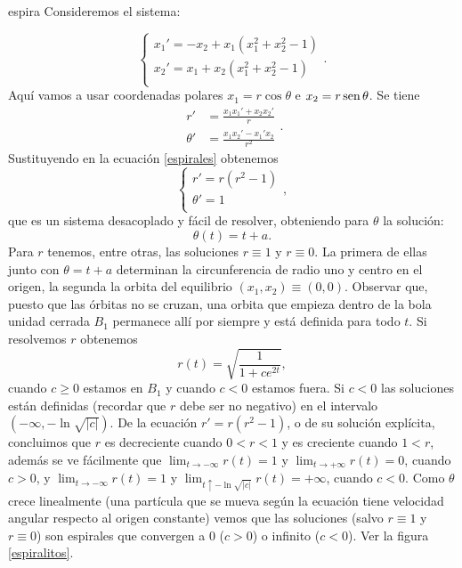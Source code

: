 \begin{ejemplo}{espira} Consideremos el sistema:

\begin{equation}\label{espirales}
\left\{%
\begin{array}{l}
    x_1'=-x_2+x_1(x_1^2+x_2^2-1) \\
    x_2'=x_1+ x_2(x_1^2+x_2^2-1)\\
\end{array} .%
\right.
\end{equation}
 Aquí vamos a
usar coordenadas polares $x_1=r\cos \theta$ e $x_2=r\sen \theta$.
Se tiene
\[
    \begin{split}
    r'&=\frac{x_1x_1'+x_2x_2'}{r}\\
    \theta'&=\frac{x_1x_2'-x_1'x_2}{r^2}
    \end{split}.
\]
Sustituyendo en la ecuación \eqref{espirales} obtenemos
\begin{equation}\label{espirales2}
\left\{%
\begin{array}{l}
    r'=r(r^2-1) \\
    \theta'=1\\
\end{array} ,%
\right.
\end{equation}
que es un sistema desacoplado y fácil de resolver, obteniendo para
$\theta$ la solución:
\[
    \theta(t)=t+a.
\]
Para $r$ tenemos, entre otras,  las soluciones $r\equiv 1$ y
$r\equiv 0$. La primera de ellas junto con $\theta=t+a$ determinan
la circunferencia de radio uno y centro en el origen, la segunda
la orbita del equilibrio $(x_1,x_2)\equiv(0,0)$. Observar que,
puesto que las órbitas no se cruzan, una orbita que empieza dentro
de la bola unidad cerrada $B_1$ permanece allí por siempre y está
definida para todo $t$. Si  resolvemos $r$ obtenemos
\[
r(t)=\sqrt{\frac{1}{1+ce^{2t}}},
\]
cuando $c\geq 0$ estamos en $B_1$ y cuando $c<0$ estamos fuera. Si
$c<0$ las soluciones están definidas (recordar que $r$ debe ser no
negativo) en el intervalo $(-\infty,-\ln\sqrt{|c|})$. De la
ecuación $r'=r(r^2-1)$, o de su solución explícita, concluimos que
$r$ es decreciente cuando $0<r<1$ y es creciente cuando $1<r$,
además se ve fácilmente que $\lim_{t\to -\infty}r(t)=1$ y
$\lim_{t\to +\infty}r(t)=0$, cuando $c>0$, y $\lim_{t\to
-\infty}r(t)=1$ y $\lim_{t\uparrow -\ln \sqrt{|c|}}r(t)=+\infty$,
cuando $c<0$. Como $\theta$ crece linealmente (una partícula que
se mueva según la ecuación tiene velocidad angular respecto al
origen constante) vemos que las soluciones (salvo $r\equiv 1$ y
$r\equiv 0$) son espirales que convergen a $0$ ($c>0$) o infinito
($c<0$). Ver la figura \ref{espiralitos}.
\begin{figure}[h]
\begin{center}
\def\Func{-y[1]+y[0]*(y[1]^2+y[0]^2-1)|y[0]+y[1]*(y[1]^2+y[0]^2-1)}


\end{center}
\end{figure}
\end{ejemplo}
